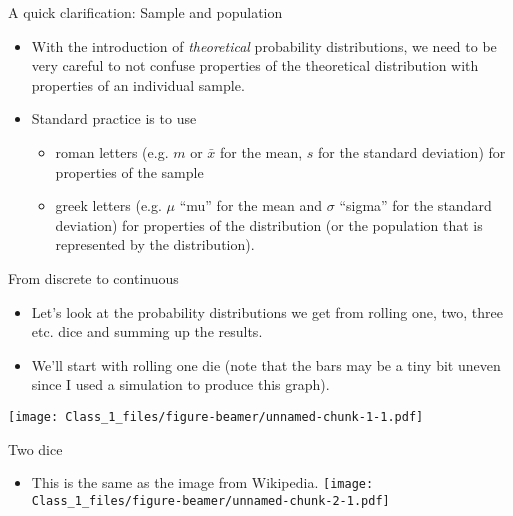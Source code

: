 \begin{frame}{A quick clarification: Sample and population}

\begin{itemize}
\itemsep1pt\parskip0pt
\item
  With the introduction of \emph{theoretical} probability distributions,
  we need to be very careful to not confuse properties of the
  theoretical distribution with properties of an individual sample.
\item
  Standard practice is to use

  \begin{itemize}
  \itemsep1pt\parskip0pt
  \item
    roman letters (e.g. \(m\) or \(\bar{x}\) for the mean, \(s\) for the
    standard deviation) for properties of the sample
  \item
    greek letters (e.g. \(\mu\) ``mu'' for the mean and \(\sigma\)
    ``sigma'' for the standard deviation) for properties of the
    distribution (or the population that is represented by the
    distribution).
  \end{itemize}
\end{itemize}

\end{frame}

\begin{frame}{From discrete to continuous}

\begin{itemize}
\itemsep1pt\parskip0pt
\item
  Let's look at the probability distributions we get from rolling one,
  two, three etc. dice and summing up the results.
\item
  We'll start with rolling one die (note that the bars may be a tiny bit
  uneven since I used a simulation to produce this graph).
\end{itemize}

\texttt{[image: Class\_1\_files/figure-beamer/unnamed-chunk-1-1.pdf]}

\end{frame}

\begin{frame}{Two dice}

\begin{itemize}
\itemsep1pt\parskip0pt
\item
  This is the same as the image from Wikipedia.
  \texttt{[image: Class\_1\_files/figure-beamer/unnamed-chunk-2-1.pdf]}
\end{itemize}

\end{frame}

